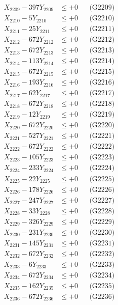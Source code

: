 \documentclass[a4paper,10pt]{article}
\begin{document}
{\begin{align}
X_{2209} - 397Y_{2209} &\leq +0 && \text{(G2209)} \\
X_{2210} - 5Y_{2210} &\leq +0 && \text{(G2210)} \\
\allowbreak
X_{2211} - 25Y_{2211} &\leq +0 && \text{(G2211)} \\
X_{2212} - 672Y_{2212} &\leq +0 && \text{(G2212)} \\
X_{2213} - 672Y_{2213} &\leq +0 && \text{(G2213)} \\
X_{2214} - 113Y_{2214} &\leq +0 && \text{(G2214)} \\
X_{2215} - 672Y_{2215} &\leq +0 && \text{(G2215)} \\
X_{2216} - 193Y_{2216} &\leq +0 && \text{(G2216)} \\
X_{2217} - 62Y_{2217} &\leq +0 && \text{(G2217)} \\
X_{2218} - 672Y_{2218} &\leq +0 && \text{(G2218)} \\
X_{2219} - 12Y_{2219} &\leq +0 && \text{(G2219)} \\
X_{2220} - 672Y_{2220} &\leq +0 && \text{(G2220)} \\
\allowbreak
X_{2221} - 527Y_{2221} &\leq +0 && \text{(G2221)} \\
X_{2222} - 672Y_{2222} &\leq +0 && \text{(G2222)} \\
X_{2223} - 105Y_{2223} &\leq +0 && \text{(G2223)} \\
X_{2224} - 233Y_{2224} &\leq +0 && \text{(G2224)} \\
X_{2225} - 22Y_{2225} &\leq +0 && \text{(G2225)} \\
X_{2226} - 178Y_{2226} &\leq +0 && \text{(G2226)} \\
X_{2227} - 247Y_{2227} &\leq +0 && \text{(G2227)} \\
X_{2228} - 33Y_{2228} &\leq +0 && \text{(G2228)} \\
X_{2229} - 326Y_{2229} &\leq +0 && \text{(G2229)} \\
X_{2230} - 231Y_{2230} &\leq +0 && \text{(G2230)} \\
\allowbreak
X_{2231} - 145Y_{2231} &\leq +0 && \text{(G2231)} \\
X_{2232} - 672Y_{2232} &\leq +0 && \text{(G2232)} \\
X_{2233} - 6Y_{2233} &\leq +0 && \text{(G2233)} \\
X_{2234} - 672Y_{2234} &\leq +0 && \text{(G2234)} \\
X_{2235} - 162Y_{2235} &\leq +0 && \text{(G2235)} \\
X_{2236} - 672Y_{2236} &\leq +0 && \text{(G2236)} \\

\end{align}}
\end{document}
